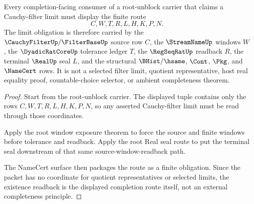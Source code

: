 \begin{theorem}
\label{thm:cauchy-filter-completion-root-cauchy-filter-limit-existence}
Every completion-facing consumer of a root-unblock carrier that claims a Cauchy-filter limit must display the finite route
$$
C,W,T,R,L,H,K,P,N .
$$
The limit obligation is therefore carried by the $\CauchyFilterUp/\FilterBaseUp$ source row $C$, the $\StreamNameUp$ windows $W$, the $\DyadicRatCoreUp$ tolerance ledger $T$, the $\RegSeqRatUp$ readback $R$, the terminal $\RealUp$ seal $L$, and the structural $\BHist/\hsame$, $\Cont$, $\Pkg$, and $\NameCert$ rows. It is not a selected filter limit, quotient representative, host real equality proof, countable-choice selector, or ambient completeness theorem.
\end{theorem}
\begin{proof}
Start from the root-unblock carrier. The displayed tuple contains only the rows $C,W,T,R,L,H,K,P,N$, so any asserted Cauchy-filter limit must be read through those coordinates.

Apply the root window exposure theorem to force the source and finite windows before tolerance and readback. Apply the root Real seal route to put the terminal seal downstream of that same source-window-readback path.

The NameCert surface then packages the route as a finite obligation. Since the packet has no coordinate for quotient representatives or selected limits, the existence readback is the displayed completion route itself, not an external completeness principle.
\end{proof}

